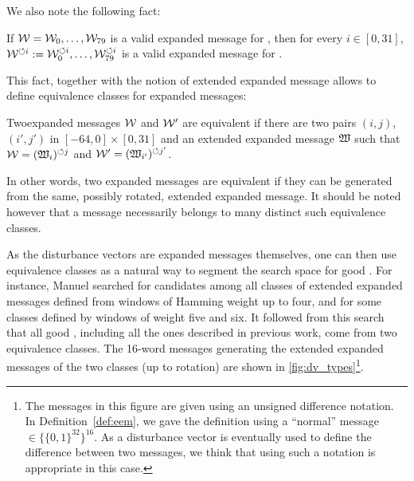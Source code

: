 We also note the following fact:
\begin{fact}
If $\expmess = \expmess_0, \ldots,\linebreak \expmess_{79}$ is a valid expanded message for \shaone, then for every $i \in [0, 31]$, $\expmess^{\circlearrowleft i} \defas
\expmess_0^{\circlearrowleft i}, \ldots,\linebreak \expmess_{79}^{\circlearrowleft i}$ is a valid expanded message for \shaone.
\end{fact}
This fact, together with the notion of extended expanded message allows to define equivalence classes for expanded messages:
\begin{defi}
Two\linebreak \shaone expanded messages $\mathcal{W}$ and $\mathcal{W}'$ are equivalent if there are two pairs $(i,j)$, $(i',j')$ in $[-64, 0] \times [0, 31]$
and an extended expanded message $\mathfrak{W}$ such that $\mathcal{W} = (\mathfrak{W}_i)^{\circlearrowleft j}$ and $\mathcal{W}' = (\mathfrak{W}_{i'})^{\circlearrowleft j'}$.
\end{defi}
In other words, two expanded messages are equivalent if they can be generated from the same, possibly rotated, extended expanded message. It should be noted
however that a message necessarily belongs to many distinct such equivalence classes.

As the disturbance vectors are expanded messages themselves, one can then use equivalence classes as a natural way to segment the search space for good \dvs. For instance,
Manuel searched for candidates among all classes of extended expanded messages defined from windows of Hamming weight up to four, and for some classes defined by
windows of weight five and six. It followed from this search that all good \dvs, including all the ones described in previous work, come from two equivalence classes.
The 16-word messages generating the extended expanded messages of the two classes (up to rotation) are shown in \autoref{fig:dv_types}\footnote{The messages in this
figure are given using an unsigned difference notation. In Definition~\ref{def:eem}, we gave the definition using a ``normal'' message $\in \{\{0,1\}^{32}\}^{16}$. As
a disturbance vector is eventually used to define the difference between two messages, we think that using such a notation is appropriate in this case.}.

